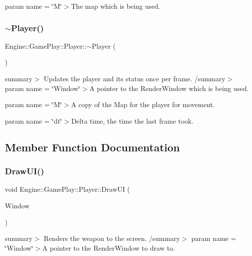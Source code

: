param name = \char`\"{}\+M\char`\"{}$>$The map which is being used.\mbox{\label{class_engine_1_1_game_play_1_1_player_a39c82fa94afe71949a7fff50fed2a4d0}} 
\subsubsection{\texorpdfstring{$\sim$\+Player()}{~Player()}}
{\footnotesize\ttfamily Engine\+::\+Game\+Play\+::\+Player\+::$\sim$\+Player (\begin{DoxyParamCaption}{ }\end{DoxyParamCaption})}

summary$>$ Updates the player and its status once per frame. /summary$>$ param name = \char`\"{}\+Window\char`\"{}$>$A pointer to the Render\+Window which is being used.

param name = \char`\"{}\+M\char`\"{}$>$A copy of the Map for the player for movement.

param name = \char`\"{}dt\char`\"{}$>$Delta time, the time the last frame took.

\subsection{Member Function Documentation}
\mbox{\label{class_engine_1_1_game_play_1_1_player_a4b3e08479cfc81c66eadf1e9da4a47fe}} 
\subsubsection{\texorpdfstring{Draw\+U\+I()}{DrawUI()}}
{\footnotesize\ttfamily void Engine\+::\+Game\+Play\+::\+Player\+::\+Draw\+UI (\begin{DoxyParamCaption}\item[{Render\+Window $\ast$}]{Window }\end{DoxyParamCaption})}

summary$>$ Renders the weapon to the screen. /summary$>$ param name = \char`\"{}\+Window\char`\"{}$>$A pointer to the Render\+Window to draw to.\mbox{\label{class_engine_1_1_game_play_1_1_player_a3705c78e4c21631432c4c21a0a4e4084}} 
